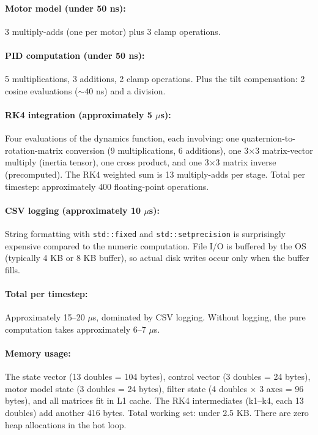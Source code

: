 \documentclass[12pt, a4paper]{article}
\begin{document}
\paragraph{Motor model (under 50 ns):}  3 multiply-adds (one per motor) plus 3 clamp operations.

\paragraph{PID computation (under 50 ns):}  5 multiplications, 3 additions, 2 clamp operations.  Plus the tilt compensation: 2 cosine evaluations ($\sim$40 ns) and a division.

\paragraph{RK4 integration (approximately 5 $\mu$s):}  Four evaluations of the dynamics function, each involving: one quaternion-to-rotation-matrix conversion (9 multiplications, 6 additions), one 3$\times$3 matrix-vector multiply (inertia tensor), one cross product, and one 3$\times$3 matrix inverse (precomputed).  The RK4 weighted sum is 13 multiply-adds per stage.  Total per timestep: approximately 400 floating-point operations.

\paragraph{CSV logging (approximately 10 $\mu$s):}  String formatting with \texttt{std::fixed} and \texttt{std::setprecision} is surprisingly expensive compared to the numeric computation.  File I/O is buffered by the OS (typically 4 KB or 8 KB buffer), so actual disk writes occur only when the buffer fills.

\paragraph{Total per timestep:}  Approximately 15--20 $\mu$s, dominated by CSV logging.  Without logging, the pure computation takes approximately 6--7 $\mu$s.

\paragraph{Memory usage:}  The state vector (13 doubles = 104 bytes), control vector (3 doubles = 24 bytes), motor model state (3 doubles = 24 bytes), filter state (4 doubles $\times$ 3 axes = 96 bytes), and all matrices fit in L1 cache.  The RK4 intermediates (k1--k4, each 13 doubles) add another 416 bytes.  Total working set: under 2.5 KB.  There are zero heap allocations in the hot loop.
\end{document}
